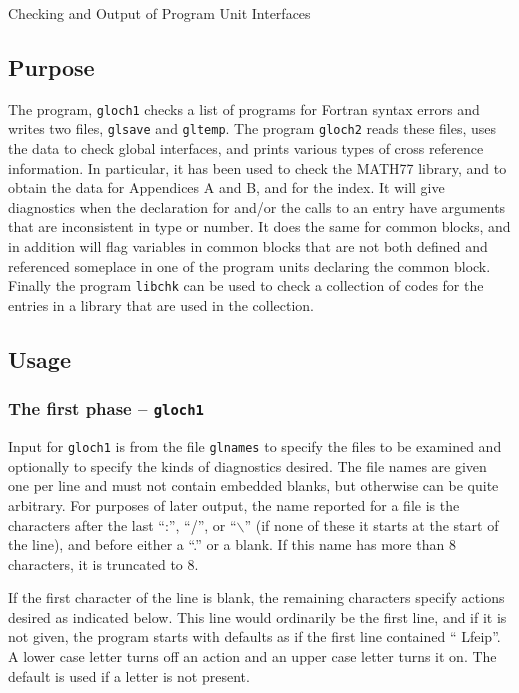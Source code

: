 \documentclass[twoside]{MATH77}
\begin{document}
 Checking and Output of Program Unit Interfaces


\subsection{Purpose}

The program, {\tt gloch1} checks a list of programs for Fortran syntax
errors and writes two files, {\tt glsave} and {\tt gltemp}.  The program
{\tt gloch2} reads these files, uses the data to check global interfaces,
and prints various types of cross reference information.  In particular,
it has been used to check the MATH77 library, and to obtain the data for
Appendices A and B, and for the index.  It will give diagnostics when the
declaration for and/or the calls to an entry have arguments that are
inconsistent in type or number.  It does the same for common blocks, and
in addition will flag variables in common blocks that are not both defined
and referenced someplace in one of the program units declaring the common
block.  Finally the program {\tt libchk} can be used to check a collection
of codes for the entries in a library that are used in the collection.

\subsection{Usage}
\subsubsection{The first phase -- {\tt gloch1}}

Input for {\tt gloch1} is from the file {\tt glnames} to specify the files
to be examined and optionally to specify the kinds of diagnostics desired.
The file names are given one per line and must not contain embedded
blanks, but otherwise can be quite arbitrary.  For purposes of later
output, the name reported for a file is the characters after the last
``:'', ``/'', or ``$\backslash $'' (if none of these it starts at the
start of the line), and before either a ``.'' or a blank.  If this name
has more than 8 characters, it is truncated to 8.

If the first character of the line is blank, the remaining characters
specify actions desired as indicated below.  This line would ordinarily be
the first line, and if it is not given, the program starts with defaults
as if the first line contained `` Lfeip''.  A lower case letter turns off
an action and an upper case letter turns it on.  The default is used if a
letter is not present.
\end{document}
